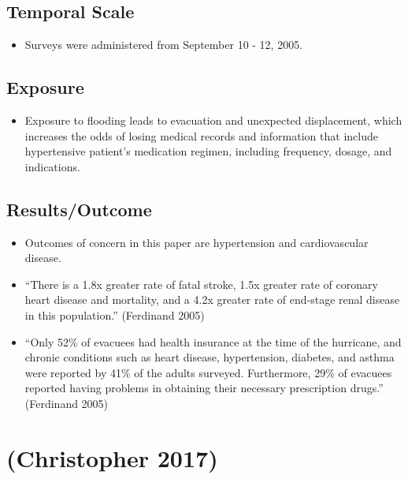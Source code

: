 \documentclass[
]{article}
\providecommand{\tightlist}{%
  \setlength{\itemsep}{0pt}\setlength{\parskip}{0pt}}
\begin{document}
\hypertarget{temporal-scale-7}{%
\subsection{Temporal Scale}\label{temporal-scale-7}}

\begin{itemize}
\tightlist
\item
  Surveys were administered from September 10 - 12, 2005.
\end{itemize}

\hypertarget{exposure-4}{%
\subsection{Exposure}\label{exposure-4}}

\begin{itemize}
\tightlist
\item
  Exposure to flooding leads to evacuation and unexpected displacement,
  which increases the odds of losing medical records and information
  that include hypertensive patient's medication regimen, including
  frequency, dosage, and indications.
\end{itemize}

\hypertarget{resultsoutcome-1}{%
\subsection{Results/Outcome}\label{resultsoutcome-1}}

\begin{itemize}
\tightlist
\item
  Outcomes of concern in this paper are hypertension and cardiovascular
  disease.
\item
  ``There is a 1.8x greater rate of fatal stroke, 1.5x greater rate of
  coronary heart disease and mortality, and a 4.2x greater rate of
  end‐stage renal disease in this population.'' (Ferdinand 2005)
\item
  ``Only 52\% of evacuees had health insurance at the time of the
  hurricane, and chronic conditions such as heart disease, hypertension,
  diabetes, and asthma were reported by 41\% of the adults surveyed.
  Furthermore, 29\% of evacuees reported having problems in obtaining
  their necessary prescription drugs.'' (Ferdinand 2005)
\end{itemize}

\hypertarget{christopher2017effects}{%
\section{(Christopher 2017)}\label{christopher2017effects}}
\end{document}
